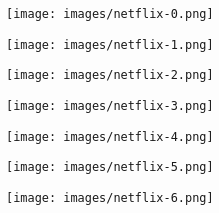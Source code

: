 \documentclass[11pt,aspectratio=169]{beamer}
\begin{document}
\begin{frame}{}

\begin{center}
\texttt{[image: images/netflix-0.png]}
\end{center}

\end{frame}

\begin{frame}{}

\begin{center}
\texttt{[image: images/netflix-1.png]}
\end{center}

\end{frame}

\begin{frame}{}

\begin{center}
\texttt{[image: images/netflix-2.png]}
\end{center}

\end{frame}

\begin{frame}{}

\begin{center}
\texttt{[image: images/netflix-3.png]}
\end{center}

\end{frame}

\begin{frame}{}

\begin{center}
\texttt{[image: images/netflix-4.png]}
\end{center}

\end{frame}

\begin{frame}{}

\begin{center}
\texttt{[image: images/netflix-5.png]}
\end{center}

\end{frame}

\begin{frame}{}

\begin{center}
\texttt{[image: images/netflix-6.png]}
\end{center}

\end{frame}
\end{document}
